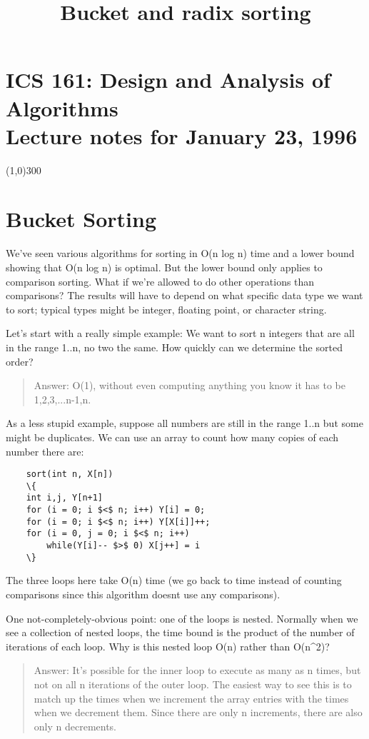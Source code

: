 \documentclass[a4paper,11pt]{article}
\title{Bucket and radix sorting}
\begin{document}
\section{ICS 161: Design and Analysis of Algorithms
  \\
  Lecture notes for January 23, 1996}

\line(1,0){300}




\section{Bucket Sorting}

We've seen various algorithms for sorting in O(n log n) time and a
lower bound showing that O(n log n) is optimal. But the lower bound
only applies to comparison sorting. What if we're allowed to do other
operations than comparisons? The results will have to depend on what
specific data type we want to sort; typical types might be integer,
floating point, or character string.


Let's start with a really simple example: We want to sort n integers
that are all in the range 1..n, no two the same. How quickly can we
determine the sorted order?
\begin{quotation}Answer: O(1), without even computing anything you
  know it has to be 1,2,3,...n-1,n.
\end{quotation}

As a less stupid example, suppose all numbers are still in the range
1..n but some might be duplicates. We can use an array to count how
many copies of each number there are:
\begin{verbatim}
    sort(int n, X[n])
    \{
    int i,j, Y[n+1]
    for (i = 0; i $<$ n; i++) Y[i] = 0;
    for (i = 0; i $<$ n; i++) Y[X[i]]++;
    for (i = 0, j = 0; i $<$ n; i++)
        while(Y[i]-- $>$ 0) X[j++] = i
    \}
\end{verbatim}

The three loops here take O(n) time (we go back to time instead of
counting comparisons since this algorithm doesnt use any comparisons).


One not-completely-obvious point: one of the loops is nested.
Normally when we see a collection of nested loops, the time bound is
the product of the number of iterations of each loop. Why is this
nested loop O(n) rather than O(n\textasciicircum{}2)?
\begin{quotation}Answer: It's possible for the inner loop to execute
  as many as n times, but not on all n iterations of the outer loop.
  The easiest way to see this is to match up the times when we
  increment the array entries with the times when we decrement them.
  Since there are only n increments, there are also only n decrements.
\end{quotation}
\end{document}
